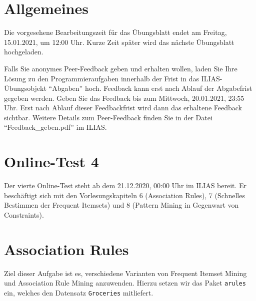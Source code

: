 \documentclass[headinclude,headsepline]{scrartcl}
\newcommand{\code}[1]{{\color[HTML]{000080}\texttt{#1}}}
\begin{document}
\section*{Allgemeines}

Die vorgesehene Bearbeitungszeit für das Übungsblatt endet am Freitag, 15.01.2021, um 12:00 Uhr.
Kurze Zeit später wird das nächste Übungsblatt hochgeladen.

Falls Sie anonymes Peer-Feedback geben und erhalten wollen, laden Sie Ihre Lösung zu den Programmieraufgaben innerhalb der Frist in das ILIAS-Übungsobjekt ``Abgaben'' hoch.
Feedback kann erst nach Ablauf der Abgabefrist gegeben werden.
Geben Sie das Feedback bis zum Mittwoch, 20.01.2021, 23:55 Uhr.
Erst nach Ablauf dieser Feedbackfrist wird dann das erhaltene Feedback sichtbar.
Weitere Details zum Peer-Feedback finden Sie in der Datei ``Feedback\_geben.pdf'' im ILIAS.

\section{Online-Test 4}

Der vierte Online-Test steht ab dem 21.12.2020, 00:00 Uhr im ILIAS bereit.
Er beschäftigt sich mit den Vorlesungskapiteln 6 (Association Rules), 7 (Schnelles Bestimmen der Frequent Itemsets) und 8 (Pattern Mining in Gegenwart von Constraints).

\section{Association Rules}

Ziel dieser Aufgabe ist es, verschiedene Varianten von Frequent Itemset Mining und Association Rule Mining anzuwenden.
Hierzu setzen wir das Paket \code{arules} ein, welches den Datensatz \code{Groceries} mitliefert.

\vspace{10pt}
\end{document}
